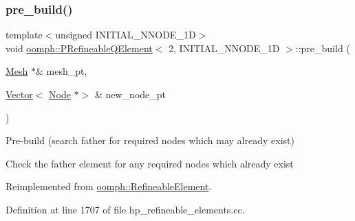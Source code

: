 \mbox{\label{classoomph_1_1PRefineableQElement_3_012_00_01INITIAL__NNODE__1D_01_4_aef49b5dd3a1f2292ad4fb11f3367fcab}} 
\subsubsection{\texorpdfstring{pre\+\_\+build()}{pre\_build()}}
{\footnotesize\ttfamily template$<$unsigned I\+N\+I\+T\+I\+A\+L\+\_\+\+N\+N\+O\+D\+E\+\_\+1D$>$ \\
void \hyperlink{classoomph_1_1PRefineableQElement}{oomph\+::\+P\+Refineable\+Q\+Element}$<$ 2, I\+N\+I\+T\+I\+A\+L\+\_\+\+N\+N\+O\+D\+E\+\_\+1D $>$\+::pre\+\_\+build (\begin{DoxyParamCaption}\item[{\hyperlink{classoomph_1_1Mesh}{Mesh} $\ast$\&}]{mesh\+\_\+pt,  }\item[{\hyperlink{classoomph_1_1Vector}{Vector}$<$ \hyperlink{classoomph_1_1Node}{Node} $\ast$$>$ \&}]{new\+\_\+node\+\_\+pt }\end{DoxyParamCaption})\hspace{0.3cm}{\ttfamily [virtual]}}



Pre-\/build (search father for required nodes which may already exist) 

Check the father element for any required nodes which already exist 

Reimplemented from \hyperlink{classoomph_1_1RefineableElement_ab30d66018b994b03731e2942f6a15f36}{oomph\+::\+Refineable\+Element}.



Definition at line 1707 of file hp\+\_\+refineable\+\_\+elements.\+cc.



